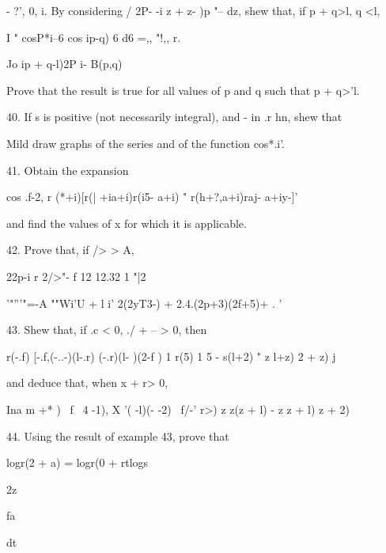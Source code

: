 - ?', 0, i. By considering / 2P- -i z + z- )p "-- dz, shew that, if p
+ q>l, q <l,

I " cosP*i--6 cos ip-q) 6 d6 =,, "!,, r.

Jo ip + q-l)2P i- B(p,q)

Prove that the result is true for all values of p and q such that p +
q>'l.


40. If s is positive (not necessarily integral), and - in .r hn, shew
that

Mild draw graphs of the series and of the function cos*.i'.

41. Obtain the expansion

cos .f-2, r (*+i)[r(| +ia+i)r(i5- a+i) " r(h+?,a+i)raj- a+iy-]'

and find the values of x for which it is applicable. 

42. Prove that, if /> > A,

22p-i r 2/>"- f 12 12.32 1 "|2

'"'''"=-A ""Wi'U + l i' 2(2yT3-) + 2.4.(2p+3)(2f+5)+ . '


43. Shew that, if .c < 0, ./ + -- > 0, then

r(-.f) [-.f,(-..-)(l-.r) (-.r)(l- )(2-f ) 1 r(5) 1 5 - s(l+2) " z
l+z) 2 + z) j

and deduce that, when x + r> 0,

  Ina m +* ) \ f \ 4   -1), X '( -l)(- -2) \ f/-' r>) z z(z +
l) - z z + l) z + 2)

44. Using the result of example 43, prove that

logr(2 + a) = logr(0 + rtlogs

2z

fa

dt

